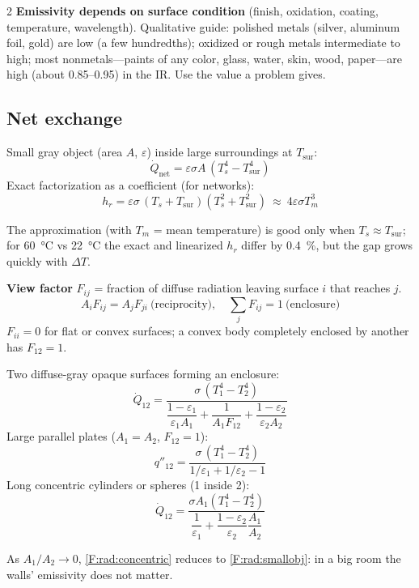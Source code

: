 \begin{multicols}{2}
\textbf{Emissivity depends on surface condition} (finish, oxidation, coating, temperature, wavelength). Qualitative guide: polished metals (silver, aluminum foil, gold) are low (a few hundredths); oxidized or rough metals intermediate to high; most nonmetals---paints of any color, glass, water, skin, wood, paper---are high (about 0.85--0.95) in the IR. Use the value a problem gives.

\subsection{Net exchange}\label{sec:netexchange}
\CORE{}
\begin{formulabox}Small gray object (area $A$, $\varepsilon$) inside large surroundings at $T_{\text{sur}}$:
\begin{equation}
\dot Q_{\text{net}}=\varepsilon\sigma A\,(T_s^4-T_{\text{sur}}^4) \label{F:rad:smallobj}
\end{equation}
Exact factorization as a coefficient (for networks):
\begin{equation}
h_r=\varepsilon\sigma\,(T_s+T_{\text{sur}})(T_s^2+T_{\text{sur}}^2)\ \approx\ 4\varepsilon\sigma T_m^3 \label{F:rad:hr}
\end{equation}
\end{formulabox}
The approximation (with $T_m$ = mean temperature) is good only when $T_s\approx T_{\text{sur}}$; for \SI{60}{\celsius} vs \SI{22}{\celsius} the exact and linearized $h_r$ differ by \SI{0.4}{\percent}, but the gap grows quickly with $\Delta T$.

\textbf{View factor} $F_{ij}$ = fraction of diffuse radiation leaving surface $i$ that reaches $j$.
\begin{equation}
A_iF_{ij}=A_jF_{ji}\ \text{(reciprocity)},\quad \textstyle\sum_jF_{ij}=1\ \text{(enclosure)} \label{F:rad:viewfactor}
\end{equation}
$F_{ii}=0$ for flat or convex surfaces; a convex body completely enclosed by another has $F_{12}=1$.

\begin{formulabox}Two diffuse-gray opaque surfaces forming an enclosure:
\begin{equation}
\dot Q_{12}=\frac{\sigma\,(T_1^4-T_2^4)}{\dfrac{1-\varepsilon_1}{\varepsilon_1A_1}+\dfrac{1}{A_1F_{12}}+\dfrac{1-\varepsilon_2}{\varepsilon_2A_2}} \label{F:rad:twosurface}
\end{equation}
Large parallel plates ($A_1=A_2$, $F_{12}=1$):
\begin{equation}
q''_{12}=\frac{\sigma\,(T_1^4-T_2^4)}{1/\varepsilon_1+1/\varepsilon_2-1} \label{F:rad:plates}
\end{equation}
Long concentric cylinders or spheres (1 inside 2):
\begin{equation}
\dot Q_{12}=\frac{\sigma A_1(T_1^4-T_2^4)}{\dfrac{1}{\varepsilon_1}+\dfrac{1-\varepsilon_2}{\varepsilon_2}\dfrac{A_1}{A_2}} \label{F:rad:concentric}
\end{equation}
\end{formulabox}
As $A_1/A_2\to0$, \eqref{F:rad:concentric} reduces to \eqref{F:rad:smallobj}: in a big room the walls' emissivity does not matter.


\end{multicols}
